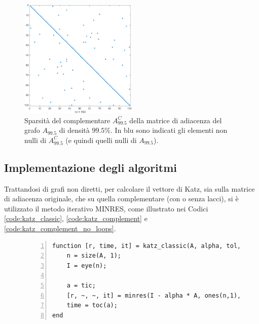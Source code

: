 \documentclass[a4paper]{article}
\newcommand{\evec}{{\bf e}}
\newcommand{\xvec}{{\bf x}}
\begin{document}
\begin{figure}[H]
    \centering
    \includegraphics[width=0.5\textwidth]{images/995_spy.png} %
    \caption{Sparsità del complementare $A_{99.5}^C$ della matrice di adiacenza del grafo $A_{99.5}$ di densità $99.5\%$. In blu sono indicati gli elementi non nulli
    di $A_{99.5}^C$ (e quindi quelli nulli di $A_{99.5}$).}
    \label{fig:spy_995}
\end{figure}

\subsection{Implementazione degli algoritmi}

Trattandosi di grafi non diretti, per calcolare il vettore di Katz, sia sulla matrice di adiacenza originale, che su quella complementare (con o senza lacci), si è
utilizzato il metodo iterativo MINRES, come illustrato nei Codici \ref{code:katz_classic}, \ref{code:katz_complement} e \ref{code:katz_complement_no_loops}.

\begin{figure}[H]
    \centering
    \begin{lstlisting}[style=Matlab-editor, frame=single, numbers=left, caption={Contenuto del file \texttt{katz\_classic.m}. La funzione risolve iterativamente col metodo MINRES il classico sistema $(I - \alpha A) \xvec = \evec$. I valori restituiti sono il vettore di Katz (\texttt{r}), il tempo impiegato per eseguire il metodo MINRES (\texttt{time}) e il numero di iterazioni del suddetto metodo (\texttt{it}).}, captionpos=b, label=code:katz_classic]
function [r, time, it] = katz_classic(A, alpha, tol, maxit)
    n = size(A, 1);
    I = eye(n);
    
    a = tic;
    [r, ~, ~, it] = minres(I - alpha * A, ones(n,1), tol, maxit);
    time = toc(a);
end      
    \end{lstlisting}
\end{figure}
\end{document}
